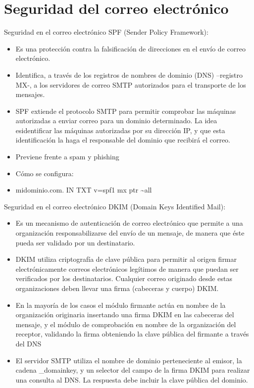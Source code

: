 \documentclass[aspectratio=169,11pt]{beamer}
\begin{document}
\section{Seguridad del correo electrónico}

\begin{frame}[allowframebreaks]{Seguridad en el correo electrónico}
\small
SPF (Sender Policy Framework):
  \begin{itemize}
  \item Es una protección contra la falsificación de direcciones en el envío de correo electrónico.
  \item Identifica, a través de los registros de nombres de dominio (DNS) --registro MX-, a los servidores de correo SMTP autorizados para el transporte de los mensajes.
  \item SPF extiende el protocolo SMTP para permitir comprobar las máquinas autorizadas a enviar correo para un dominio determinado. La idea esidentificar las máquinas autorizadas por su dirección IP, y que esta identificación la haga el responsable del dominio que recibirá el correo.
  \item Previene frente a spam y phishing
  \item Cómo se configura:
  \item midominio.com. IN TXT \textquotedbl{}v=spf1 mx ptr \textasciitilde{}all\textquotedbl{}
  \end{itemize}
\end{frame}

\begin{frame}{Seguridad en el correo electrónico}
\footnotesize
DKIM (Domain Keys Identified Mail):
  \begin{itemize}
  \item Es un mecanismo de autenticación de correo electrónico que permite a una organización responsabilizarse del envío de un mensaje, de manera que éste pueda ser validado por un destinatario.
  \item DKIM utiliza criptografía de clave pública para permitir al origen firmar electrónicamente correos electrónicos legítimos de manera que puedan ser verificados por los destinatarios. Cualquier correo originado desde estas organizaciones deben llevar una firma (cabeceras y cuerpo) DKIM.
  \item En la mayoría de los casos el módulo firmante actúa en nombre de la organización originaria insertando una firma DKIM en las cabeceras del mensaje, y el módulo de comprobación en nombre de la organización del receptor, validando la firma obteniendo la clave pública del firmante a través del DNS
  \item El servidor SMTP utiliza el nombre de dominio perteneciente al emisor, la cadena \textquotedbl{}\_domainkey\textquotedbl{}, y un selector del campo de la firma DKIM para realizar una consulta al DNS. La respuesta debe incluir la clave pública del dominio.
  \end{itemize}
\end{frame}
\end{document}
